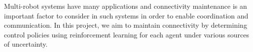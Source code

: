\documentclass[conf]{new-aiaa}
\begin{document}
Multi-robot systems have many applications and connectivity maintenance is an important factor to consider in such systems in order to enable coordination and communication. In this project, we aim to maintain connectivity by determining control policies using reinforcement learning for each agent under various sources of uncertainty.


\end{document}
